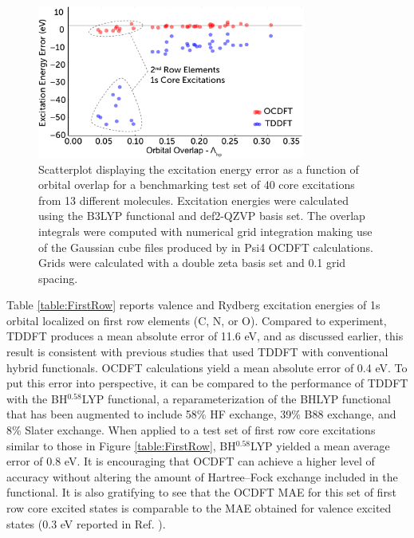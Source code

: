 \documentclass{article}
\begin{document}
\begin{figure}[!b]
\centering
\includegraphics[width=8.8cm]{scatterNEWER2.pdf}
\caption{Scatterplot displaying the excitation energy error as a function of orbital overlap for a benchmarking test set of 40 core excitations from 13 different molecules. Excitation energies were calculated using the B3LYP functional and def2-QZVP basis set. The overlap integrals were computed with numerical grid integration making use of the Gaussian cube files produced by in Psi4 OCDFT calculations. Grids were calculated with a double zeta basis set and 0.1 grid spacing.}
\label{figure:scatter}
\end{figure}
Table \ref{table:FirstRow} reports valence and Rydberg excitation energies of 1s orbital localized on first row elements (C, N, or O). Compared to experiment, TDDFT produces a mean absolute error of 11.6 eV, and as discussed earlier, this result is consistent with previous studies that used TDDFT with conventional hybrid functionals.\cite{besley_self-consistent-field_2009} OCDFT calculations yield a mean absolute error of 0.4 eV. To put this error into perspective, it can be compared to the performance of TDDFT with the BH$^{0.58}$LYP functional,\cite{besley_time-dependent_2009} a reparameterization of the BHLYP functional\cite{becke_new_1993,lee_development_1988-1} that has been augmented to include 58\% HF exchange, 39\% B88 exchange, and 8\% Slater exchange. When applied to a test set of first row core excitations similar to those in Figure \ref{table:FirstRow}, BH$^{0.58}$LYP yielded a mean average error of 0.8 eV. It is encouraging that OCDFT can achieve a higher level of accuracy without altering the amount of Hartree--Fock exchange included in the functional. It is also gratifying to see that the OCDFT MAE for this set of first row core excited states is comparable to the MAE obtained for valence excited states (0.3 eV reported in Ref. ).
\end{document}

